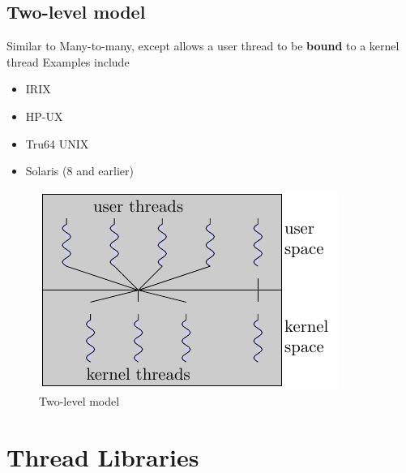 \documentclass{book/custombook}
\begin{document}
            \subsection{Two-level model}
                Similar to Many-to-many, except allows a user thread to be \textbf{bound} to a kernel thread
                Examples include
                \begin{itemize}
                    \item IRIX
                    \item HP-UX
                    \item Tru64 UNIX
                    \item Solaris (8 and earlier)
                \end{itemize}
                \begin{figure}[H]
                    \centering
                    \includegraphics{figures/two_level.pdf}
                    \caption{Two-level model}
                \end{figure}
        \section{Thread Libraries}
\end{document}
